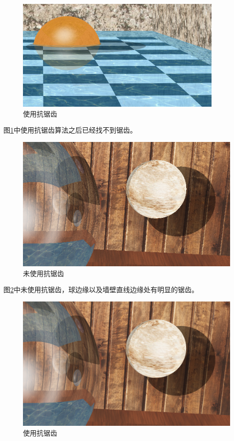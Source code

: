 \begin{figure}[!htbp]
    \centering
    \includegraphics[width=\columnwidth]{aa}
    \caption{使用抗锯齿}\label{fig:aa0}
\end{figure}

图\ref{fig:aa0}中使用抗锯齿算法之后已经找不到锯齿。

\begin{figure}[!htbp]
    \centering
    \includegraphics[width=\columnwidth]{org1}
    \caption{未使用抗锯齿}\label{fig:aa1con}
\end{figure}

图\ref{fig:aa1con}中未使用抗锯齿，球边缘以及墙壁直线边缘处有明显的锯齿。

\begin{figure}[!htbp]
    \centering
    \includegraphics[width=\columnwidth]{aa1}
    \caption{使用抗锯齿}\label{fig:aa1}
\end{figure}

